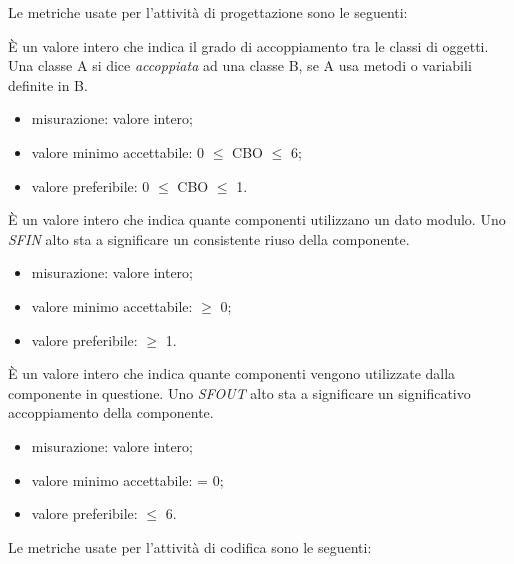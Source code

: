 		Le metriche usate per l'attività di progettazione sono le seguenti:
		
			È un valore intero che indica il grado di accoppiamento tra le classi di oggetti. Una classe A si dice \textit{accoppiata} ad una classe B, se A usa metodi o variabili definite in B.
		\begin{itemize}
			\item{misurazione: valore intero;}
			\item{valore minimo accettabile: 0 $\leq$ CBO $\leq$ 6;}
			\item{valore preferibile: 0 $\leq$ CBO $\leq$ 1.}
		\end{itemize}

		
			È un valore intero che indica quante componenti utilizzano un dato modulo. Uno \textit{SFIN} alto sta a significare un consistente riuso della componente.
		\begin{itemize}
			\item{misurazione: valore intero;}
			\item{valore minimo accettabile: $\geq$ 0;}
			\item{valore preferibile: $\geq$ 1.}
		\end{itemize}
	
			È un valore intero che indica quante componenti vengono utilizzate dalla componente in questione. Uno \textit{SFOUT} alto sta a significare un significativo accoppiamento della componente.
		\begin{itemize}
			\item{misurazione: valore intero;}
			\item{valore minimo accettabile: = 0;}
			\item{valore preferibile: $\leq$ 6.}
		\end{itemize}
		
		Le metriche usate per l'attività di codifica sono le seguenti:
					
